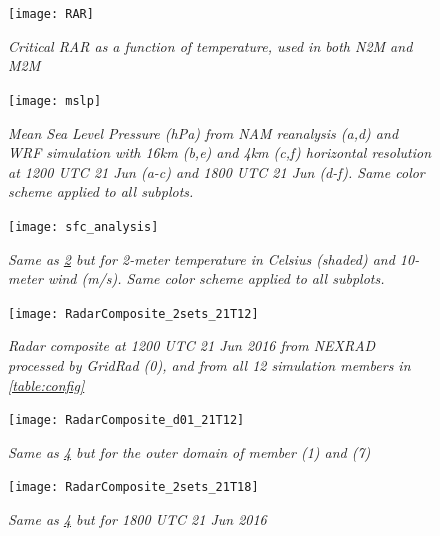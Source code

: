 \begin{figure}[H]
\centering
\vspace{-20pt}
\texttt{[image: RAR]}
\singlespacing
\vspace{-40pt}
\caption{\textit{Critical RAR as a function of temperature, used in both N2M and M2M}}
\label{fig:RAR}
\end{figure}


\begin{figure}[H]
\centering
\texttt{[image: mslp]}
\singlespacing
\vspace{-10pt}
\caption{\textit{Mean Sea Level Pressure (hPa) from NAM reanalysis (a,d) and WRF simulation with 16km (b,e) and 4km (c,f) horizontal resolution at 1200 UTC 21 Jun (a-c) and 1800 UTC 21 Jun (d-f). Same color scheme applied to all subplots.}}
\label{fig:mslp}
\end{figure}

\begin{figure}[H]
\centering
\texttt{[image: sfc\_analysis]}
\singlespacing
\vspace{-10pt}
\caption{\textit{Same as \ref{fig:mslp} but for 2-meter temperature in Celsius (shaded) and 10-meter wind (m/s). Same color scheme applied to all subplots.}}
\label{fig:sfc_analysis}
\end{figure}

\begin{figure}[H]
\centering
\texttt{[image: RadarComposite\_2sets\_21T12]}
\singlespacing
\vspace{-10pt}
\caption{\textit{Radar composite at 1200 UTC 21 Jun 2016 from NEXRAD processed by GridRad (0), and from all 12 simulation members in \ref{table:config}}}
\label{fig:radard02_21T12}
\end{figure}

\begin{figure}[H]
\centering
\texttt{[image: RadarComposite\_d01\_21T12]}
\singlespacing
\vspace{-10pt}
\caption{\textit{Same as \ref{fig:radard02_21T12} but for the outer domain of member (1) and (7)}}
\label{fig:radard01_21T12}
\end{figure}

\begin{figure}[H]
\centering
\texttt{[image: RadarComposite\_2sets\_21T18]}
\singlespacing
\vspace{-10pt}
\caption{\textit{Same as \ref{fig:radard02_21T12} but for 1800 UTC 21 Jun 2016}}
\label{fig:radard02_21T18}
\end{figure}


